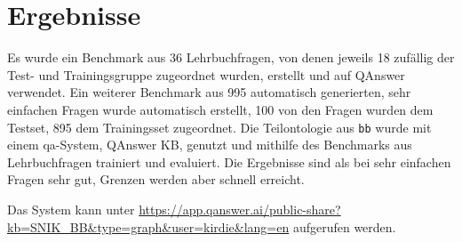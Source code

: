 \chapter{Ergebnisse}\label{ch:results}
Es wurde ein Benchmark aus 36 Lehrbuchfragen, von denen jeweils 18 zufällig der Test- und Trainingsgruppe zugeordnet wurden, erstellt und auf QAnswer verwendet.
Ein weiterer Benchmark aus 995 automatisch generierten, sehr einfachen Fragen wurde automatisch erstellt, 100 von den Fragen wurden dem Testset, 895 dem Trainingsset zugeordnet.
Die Teilontologie aus \texttt{bb} wurde mit einem \ac{qa}-System, QAnswer KB, genutzt und mithilfe des Benchmarks aus Lehrbuchfragen trainiert und evaluiert.
Die Ergebnisse sind als bei sehr einfachen Fragen sehr gut, Grenzen werden aber schnell erreicht.

Das System kann unter \url{https://app.qanswer.ai/public-share?kb=SNIK_BB&type=graph&user=kirdie&lang=en} aufgerufen werden.
